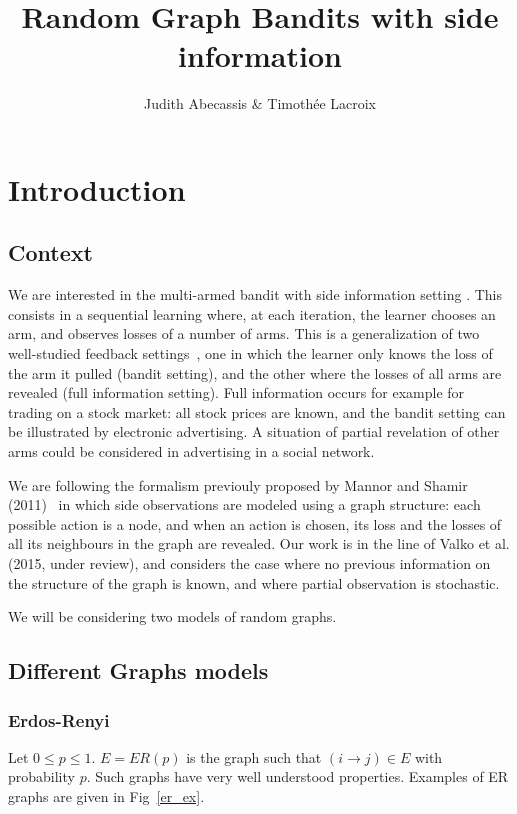 \documentclass[10pt,a4paper]{scrartcl}
\author{Judith Abecassis \& Timothée Lacroix}
\title{Random Graph Bandits with side information}
\begin{document}
\maketitle

\section{Introduction}
\subsection{Context}
We are interested in the multi-armed bandit with side information setting \cite{mannor2011bandits, alon2013bandits, kocak2014efficient}. This consists in a sequential learning where, at each iteration, the learner chooses an arm, and observes losses of a number of arms. This is a generalization of two well-studied feedback settings~\cite{cesa2006prediction}, one in which the learner only knows the loss of the arm it pulled (bandit setting), and the other where the losses of all arms are revealed (full information setting). Full information occurs for example for trading on a stock market: all stock prices are known, and the bandit setting can be illustrated by electronic advertising. A situation of partial revelation of other arms could be considered in advertising in a social network.

We are following the formalism previouly proposed by Mannor and Shamir (2011)~\cite{mannor2011bandits} in which side observations are modeled using a graph structure: each possible action is a node, and when an action is chosen, its loss and the losses of all its neighbours in the graph are revealed. Our work is in the line of Valko et al. (2015, under review), and considers the case where no previous information on the structure of the graph is known, and where partial observation is stochastic. 

We will be considering two models of random graphs.

\subsection{Different Graphs models}

\subsubsection{Erdos-Renyi}
Let $0\leq p \leq 1$. $E=ER(p)$ is the graph such that $(i \rightarrow j) \in E$ with probability $p$. Such graphs have very well understood properties.
Examples of ER graphs are given in Fig~\ref{er_ex}.
\end{document}
